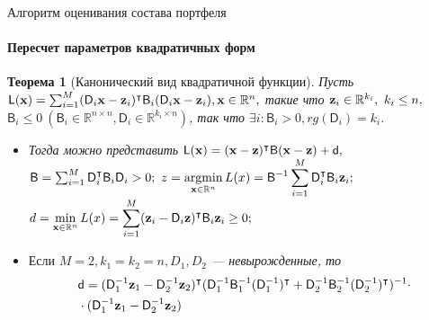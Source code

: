 \documentclass[1pt]{beamer}
\newtheorem{rustheorem}{Теорема }
\DeclareMathOperator*{\argmin}{argmin}
\let\T\intercal
\def\msf_#1{\mathsf{#1}}
\def\bo_#1{\bold{#1}}
\begin{document}
\begin{frame}{Алгоритм оценивания состава портфеля}
\framesubtitle{Пересчет параметров квадратичных форм}
\begin{rustheorem}[Канонический вид квадратичной функции]
	Пусть $\msf_L(\bo_x) = \sum_{i=1}^M(\msf_D_i\bo_x - \bo_z_i)^\T\msf_B_i(\msf_D_i\bo_x - \bo_z_i), \bo_x\in\mathbb{R}^n,$ такие что $\bo_z_i\in\mathbb{R}^{k_i},\ k_i\leq n,$\\
		$\msf_B_i\leq 0\  (\msf_B_i\in\mathbb{R}^{n\times n},\msf_D_i\in\mathbb{R}^{k_i\times n})$, так что $\exists i: \msf_B_i>0, rg(\msf_D_i)=k_i.$\\
\begin{itemize}
\item Тогда можно представить $\msf_L(\bo_x) = (\bo_x  - \bo_z)^\T\msf_B(\bo_x-\bo_z)+\msf_d,$\\
$\msf_B = \sum_{i=1}^M \msf_D_i^\T\msf_B_i\msf_D_i>0;\ z=\displaystyle\argmin_{\bo_x\in\mathbb{R}^n}L(x)={\msf_B}^{-1}\sum_{i=1}^M
		\msf_D_i^\T\msf_B_i\bo_z_i;$\\
$d = \displaystyle\min_{\bo_x\in\mathbb{R}^n}L(x)=\sum_{i=1}^M(\bo_z_i-\msf_D_i\bo_z)^\T\msf_B_i\bo_z_i\geq0;$\\
\item $\text{Если }M=2, k_1=k_2=n, D_1, D_2$ --- невырожденные, то
\begin{align*}
&\msf_d=(\msf_D_1^{-1}\bo_z_1-\msf_D_2^{-1}\bo_z_2)^\T(\msf_D_1^{-1}\msf_B_1^{-1}(\msf_D_1^{-1})^\T+\msf_D_2^{-1}\msf_B_2^{-1}(\msf_D_2^{-1})^\T)^{-1}\cdot\\
		&\cdot(\msf_D_1^{-1}\bo_z_1-\msf_D_2^{-1}\bo_z_2)
\end{align*}
\end{itemize}
\end{rustheorem}
\end{frame}
\end{document}
